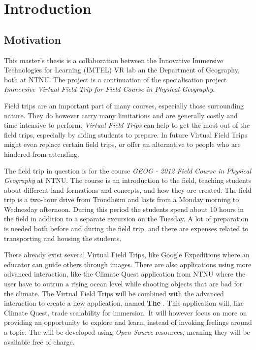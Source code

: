 \chapter{Introduction}
\section{Motivation}
    \label{sec:motivation}
    This master's thesis is a collaboration between the Innovative Immersive Technologies for Learning (IMTEL) VR lab an the Department of Geography, both at NTNU. The project is a continuation of the specialisation project \emph{Immersive Virtual Field Trip for Field Course in Physical Geography}\cite{specialisation}.
    
    Field trips are an important part of many courses, especially those surrounding nature. They do however carry many limitations and are generally costly and time intensive to perform. \emph{Virtual Field Trips} can help to get the most out of the field trips, especially by aiding students to prepare. In future Virtual Field Trips might even replace certain field trips, or offer an alternative to people who are hindered from attending.
    
    The field trip in question is for the course \emph{GEOG - 2012 Field Course in Physical Geography} at NTNU. The course is an introduction to the field, teaching students about different land formations and concepts, and how they are created\cite{geog2012}. The field trip is a two-hour drive from Trondheim and lasts from a Monday morning to Wednesday afternoon. During this period the students spend about 10 hours in the field in addition to a separate excursion on the Tuesday. A lot of preparation is needed both before and during the field trip, and there are expenses related to transporting and housing the students.
    
    There already exist several Virtual Field Trips, like Google Expeditions\cite{google_expeditions} where an educator can guide others through images. There are also applications using more advanced interaction, like the Climate Quest\cite{bachelor} application from NTNU where the user have to outrun a rising ocean level while shooting objects that are bad for the climate.
    The  Virtual Field Trips will be combined with the advanced interaction to create a new application, named \textbf{The \ApplicationName}. This application will, like Climate Quest, trade scalability for immersion. It will however focus on more on providing an opportunity to explore and learn, instead of invoking feelings around a topic. The \ApplicationName \hspace{0.1cm} will be developed using \emph{Open Source} resources, meaning they will be available free of charge.
    
